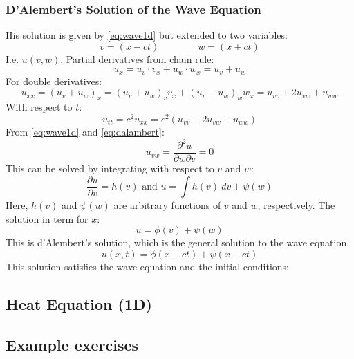\subsubsection{D’Alembert’s Solution of the Wave Equation}
His solution is given by \cref{eq:wave1d} but extended to two variables:
\begin{equation}
  v=(x-ct) \quad\quad\quad\quad w=(x+ct)
  \label{eq:dalambert}
\end{equation}
I.e. $u(v,w)$. Partial derivatives from chain rule:
\[
  u_x=u_v \cdot v_x+u_w\cdot w_x=u_v+u_w
\]
For double derivatives:
\[
  u_{xx}=(u_v+u_w)_x=(u_v+u_w)_v v_x+(u_v+u_w)_w w_x=u_{vv}+2u_{vw}+u_{ww}
\]
With respect to $t$:
\[
  u_{tt}=c^2u_{xx}=c^2(u_{vv}+2u_{vw}+u_{ww})
\]
From \cref{eq:wave1d} and \cref{eq:dalambert}:
\[
  u_{vw}=\frac{\partial^2u}{\partial w \partial v}=0
\]
This can be solved by integrating with respect to $v$ and $w$:
\[
  \frac{\partial u}{\partial v}=h(v) \text{ and } u=\int h(v)\ dv + \psi(w)
\]
Here, $h(v)$ and $\psi(w)$ are arbitrary functions of $v$ and $w$, respectively.
The solution in term for $x$:
\[
  u=\phi(v)+\psi(w)
\]
This is d'Alembert's solution, which is the general solution to the wave equation.
\[
  u(x,t)=\phi(x+ct)+\psi(x-ct)
\]
This solution satisfies the wave equation and the initial conditions:




\subsection{Heat Equation (1D)}

\subsection{Example exercises}
